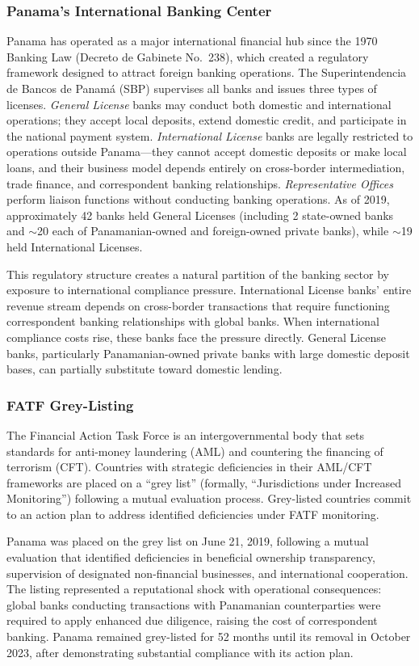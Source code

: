 \documentclass[12pt]{article}
\begin{document}
\subsubsection*{Panama's International Banking Center}
Panama has operated as a major international financial hub since the 1970 Banking Law (Decreto de Gabinete No.\ 238), which created a regulatory framework designed to attract foreign banking operations. The Superintendencia de Bancos de Panam\'a (SBP) supervises all banks and issues three types of licenses. \textit{General License} banks may conduct both domestic and international operations; they accept local deposits, extend domestic credit, and participate in the national payment system. \textit{International License} banks are legally restricted to operations outside Panama---they cannot accept domestic deposits or make local loans, and their business model depends entirely on cross-border intermediation, trade finance, and correspondent banking relationships. \textit{Representative Offices} perform liaison functions without conducting banking operations. As of 2019, approximately 42 banks held General Licenses (including 2 state-owned banks and $\sim$20 each of Panamanian-owned and foreign-owned private banks), while $\sim$19 held International Licenses.

This regulatory structure creates a natural partition of the banking sector by exposure to international compliance pressure. International License banks' entire revenue stream depends on cross-border transactions that require functioning correspondent banking relationships with global banks. When international compliance costs rise, these banks face the pressure directly. General License banks, particularly Panamanian-owned private banks with large domestic deposit bases, can partially substitute toward domestic lending.

\subsubsection*{FATF Grey-Listing}
The Financial Action Task Force is an intergovernmental body that sets standards for anti-money laundering (AML) and countering the financing of terrorism (CFT). Countries with strategic deficiencies in their AML/CFT frameworks are placed on a ``grey list'' (formally, ``Jurisdictions under Increased Monitoring'') following a mutual evaluation process. Grey-listed countries commit to an action plan to address identified deficiencies under FATF monitoring.

Panama was placed on the grey list on June 21, 2019, following a mutual evaluation that identified deficiencies in beneficial ownership transparency, supervision of designated non-financial businesses, and international cooperation. The listing represented a reputational shock with operational consequences: global banks conducting transactions with Panamanian counterparties were required to apply enhanced due diligence, raising the cost of correspondent banking. Panama remained grey-listed for 52 months until its removal in October 2023, after demonstrating substantial compliance with its action plan.
\end{document}
